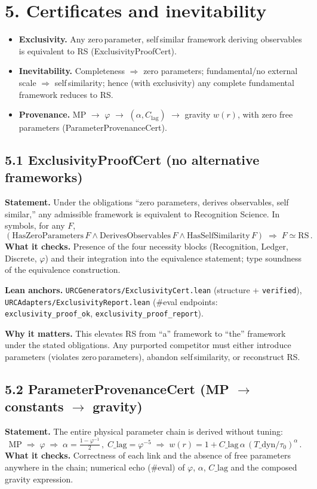 \documentclass[11pt]{article}
\begin{document}
\section*{5. Certificates and inevitability}
\begin{itemize}[leftmargin=*]
  \item \textbf{Exclusivity.} Any zero\,parameter, self\,similar framework deriving observables is equivalent to RS (ExclusivityProofCert).
  \item \textbf{Inevitability.} Completeness $\Rightarrow$ zero parameters; fundamental/no external scale $\Rightarrow$ self\,similarity; hence (with exclusivity) any complete fundamental framework reduces to RS.
  \item \textbf{Provenance.} MP $\to$ $\varphi$ $\to$ $(\alpha, C_{\mathrm{lag}})$ $\to$ gravity $w(r)$, with zero free parameters (ParameterProvenanceCert).
\end{itemize}

\subsection*{5.1 ExclusivityProofCert (no alternative frameworks)}
\textbf{Statement.} Under the obligations “zero parameters, derives observables, self\,similar,” any admissible framework is equivalent to Recognition Science. In symbols, for any $F$,
\[
  (\text{HasZeroParameters}\,F \wedge \text{DerivesObservables}\,F \wedge \text{HasSelfSimilarity}\,F) \;\Rightarrow\; F \simeq \text{RS}\,.
\]
\textbf{What it checks.} Presence of the four necessity blocks (Recognition, Ledger, Discrete, $\varphi$) and their integration into the equivalence statement; type soundness of the equivalence construction.

\textbf{Lean anchors.} \texttt{URCGenerators/ExclusivityCert.lean} (structure + \texttt{verified}), \texttt{URCAdapters/ExclusivityReport.lean} (\#eval endpoints: \texttt{exclusivity\_proof\_ok}, \texttt{exclusivity\_proof\_report}).

\textbf{Why it matters.} This elevates RS from “a” framework to “the” framework under the stated obligations. Any purported competitor must either introduce parameters (violates zero\,parameters), abandon self\,similarity, or reconstruct RS.

\subsection*{5.2 ParameterProvenanceCert (MP $\to$ constants $\to$ gravity)}
\textbf{Statement.} The entire physical parameter chain is derived without tuning:
\[
  \text{MP}\;\Rightarrow\;\varphi\;\Rightarrow\; \alpha=\tfrac{1-\varphi^{-1}}{2}\,,\; C\_{\!\mathrm{lag}}=\varphi^{-5}\;\Rightarrow\; w(r)=1 + C\_{\!\mathrm{lag}}\,\alpha\,(T\_{\!\mathrm{dyn}}/\tau_0)^{\alpha}\,.
\]
\textbf{What it checks.} Correctness of each link and the absence of free parameters anywhere in the chain; numerical echo (\#eval) of $\varphi$, $\alpha$, $C\_{\!\mathrm{lag}}$ and the composed gravity expression.
\end{document}
